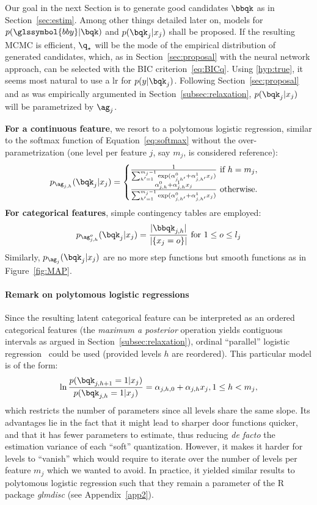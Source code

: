 Our goal in the next Section is to generate good candidates $\bbqk$ as in Section~\ref{sec:estim}. Among other things detailed later on, models for $p(\glssymbol{bby} | \bqk)$ and $p(\bqk_j | x_j)$ shall be proposed. If the resulting MCMC is efficient, $\q_\star$ will be the mode of the empirical distribution of generated candidates, which, as in Section~\ref{sec:proposal} with the neural network approach, can be selected with the BIC criterion~\eqref{eq:BICq}. Using \eqref{hyp:true}, it seems most natural to use a \gls{lr} for $p( y | \bqk_j)$. Following Section~\ref{sec:proposal} and as was empirically argumented in Section~\ref{subsec:relaxation}, $p(\bqk_j | x_j)$ will be parametrized by $\ag_j$. 

{\bf For a continuous feature}, we resort to a polytomous logistic regression, similar to the softmax function of Equation~\eqref{eq:softmax} without the over-parametrization (one level per feature $j$, say $m_j$, is considered reference):
\[ p_{\ag_{j,h}}(\bqk_j | x_j) = \begin{cases} \frac{1}{\sum_{h'=1}^{m_j-1} \exp(\alpha_{j,h'}^0 + \alpha_{j,h'}^1 x_j)} \text{ if } h = m_j, \\ \frac{\alpha_{j,h}^0 + \alpha_{j,h}^1 x_j}{\sum_{h'=1}^{m_j-1} \exp(\alpha_{j,h'}^0 + \alpha_{j,h'}^1 x_j)} \text{ otherwise.} \end{cases} \]
{\bf For categorical features}, simple contingency tables are employed:
\[ p_{\ag_{j,h}^o}(\bqk_j | x_j) = \frac{|\bbqk_{j,h}|}{|\{x_j=o\}|} \text{ for } 1 \leq o \leq l_j \]
Similarly, $p_{\ag_j}(\bqk_j | x_j)$ are no more step functions but smooth functions as in Figure~\ref{fig:MAP}.

\paragraph{Remark on polytomous logistic regressions}

Since the resulting latent categorical feature can be interpreted as an ordered categorical features (the \textit{maximum a posterior} operation yields contiguous intervals as argued in Section~\ref{subsec:relaxation}), ordinal ``parallel'' logistic regression~\cite{o2006logistic} could be used (provided levels $h$ are reordered). This particular model is of the form:
\[ \ln \frac{p(\bqk_{j,h+1} = 1 | x_j)}{p(\bqk_{j,h} = 1 | x_j)} = \alpha_{j,h,0} + \alpha_{j,h} x_j, 1 \leq h < m_j, \]
which restricts the number of parameters since all levels share the same slope. Its advantages lie in the fact that it might lead to sharper door functions quicker, and that it has fewer parameters to estimate, thus reducing \textit{de facto} the estimation variance of each ``soft'' quantization. However, it makes it harder for levels to ``vanish'' which would require to iterate over the number of levels per feature $m_j$ which we wanted to avoid. In practice, it yielded similar results to polytomous logistic regression such that they remain a parameter of the \textsf{R} package \textit{glmdisc} (see Appendix~\ref{app2}).

